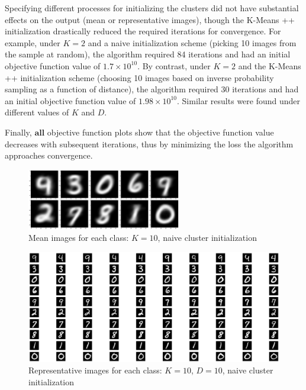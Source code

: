 \documentclass[submit]{harvardml}
\begin{document}
Specifying different processes for initializing the clusters did not have substantial effects on the output (mean or representative images), though the K-Means ++ initialization drastically reduced the required iterations for convergence. For example, under $K=2$ and a naive initialization scheme (picking 10 images from the sample at random), the algorithm required 84 iterations and had an initial objective function value of $1.7\times 10^{10}$. By contrast, under $K=2$ and the K-Means ++ initialization scheme (choosing 10 images based on inverse probability sampling as a function of distance), the algorithm required 30 iterations and had an initial objective function value of $1.98\times 10^{10}$. Similar results were found under different values of $K$ and $D$. 

Finally, $\textbf{all}$ objective function plots show that the objective function value decreases with subsequent iterations, thus by minimizing the loss the algorithm approaches convergence. 

\newpage

\begin{figure}
	\centering
	\includegraphics[width=0.6\textwidth]{output_11_0.png}
	\caption{Mean images for each class: $K = 10$, naive cluster initialization }
\end{figure}

\begin{figure}
	\centering
	\includegraphics[width=1.0\textwidth]{output_11_1.png}
	\caption{Representative images for each class: $K = 10$, $D = 10$, naive cluster initialization }
\end{figure}
\end{document}

